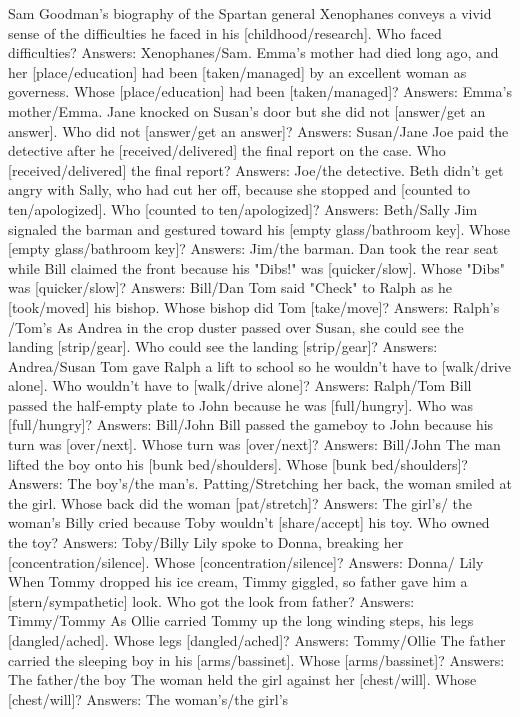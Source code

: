 \begin{foo}
Sam Goodman's biography of the Spartan general Xenophanes conveys a vivid sense of the difficulties he faced in his [childhood/research]. Who faced difficulties? Answers: Xenophanes/Sam.
Emma's mother had died long ago, and her [place/education] had been [taken/managed] by an excellent woman as governess. Whose [place/education] had been [taken/managed]? Answers: Emma's mother/Emma.
Jane knocked on Susan's door but she did not [answer/get an answer]. Who did not [answer/get an answer]? Answers: Susan/Jane
Joe paid the detective after he [received/delivered] the final report on the case. Who [received/delivered] the final report? Answers: Joe/the detective.
Beth didn't get angry with Sally, who had cut her off, because she stopped and [counted to ten/apologized]. Who [counted to ten/apologized]? Answers: Beth/Sally
Jim signaled the barman and gestured toward his [empty glass/bathroom key]. Whose [empty glass/bathroom key]? Answers: Jim/the barman.
Dan took the rear seat while Bill claimed the front because his "Dibs!" was [quicker/slow]. Whose "Dibs" was [quicker/slow]? Answers: Bill/Dan
Tom said "Check" to Ralph as he [took/moved] his bishop. Whose bishop did Tom [take/move]? Answers:  Ralph's /Tom's
As Andrea in the crop duster passed over Susan, she could see the landing [strip/gear]. Who could see the landing [strip/gear]? Answers: Andrea/Susan
Tom gave Ralph a lift to school so he wouldn't have to [walk/drive alone]. Who wouldn't have to [walk/drive alone]? Answers: Ralph/Tom
Bill passed the half-empty plate to John because he was [full/hungry]. Who was [full/hungry]? Answers: Bill/John
Bill passed the gameboy to John because his turn was [over/next]. Whose turn was [over/next]? Answers: Bill/John
The man lifted the boy onto his [bunk bed/shoulders]. Whose [bunk bed/shoulders]? Answers: The boy's/the man's. 
Patting/Stretching her back, the woman smiled at the girl. Whose back did the woman [pat/stretch]? Answers: The girl's/ the woman's
Billy cried because Toby wouldn't [share/accept] his toy. Who owned the toy? Answers: Toby/Billy
Lily spoke to Donna, breaking her [concentration/silence]. Whose [concentration/silence]? Answers: Donna/ Lily
When Tommy dropped his ice cream, Timmy giggled, so father gave him a [stern/sympathetic] look. Who got the look from father? Answers: Timmy/Tommy
As Ollie carried Tommy up the long winding steps, his legs [dangled/ached]. Whose legs [dangled/ached]? Answers: Tommy/Ollie
The father carried the sleeping boy in his [arms/bassinet]. Whose [arms/bassinet]? Answers: The father/the boy
The woman held the girl against her [chest/will]. Whose [chest/will]? Answers: The woman's/the girl's

\end{foo}
